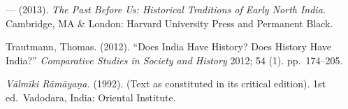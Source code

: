 \begin{thebibliography}{99}
  --- (2013). \textit{The Past Before Us: Historical Traditions of Early North India.} Cambridge, MA \& London: Harvard University Press and Permanent Black.

  Trautmann, Thomas. (2012). “Does India Have History? Does History Have India?” \textit{Comparative Studies in Society and History} 2012; 54 (1). pp.~174--205.

  \textit{Vālmīki Rāmāyaṇa.} (1992). (Text as constituted in its critical edition). 1st ed.\ Vadodara, India: Oriental Institute.

 \end{thebibliography}

